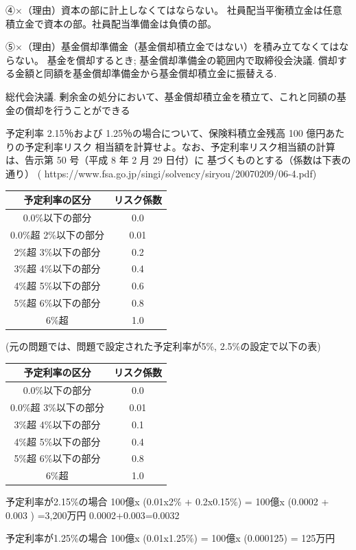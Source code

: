 \documentclass[report,gutter=10mm,fore-edge=10mm,uplatex,dvipdfmx]{jlreq}
\begin{document}
④×（理由）資本の部に計上しなくてはならない。
社員配当平衡積立金は任意積立金で資本の部。社員配当準備金は負債の部。

⑤×（理由）基金償却準備金（基金償却積立金ではない）を積み立てなくてはならない。
基金を償却するとき;   
  基金償却準備金の範囲内で取締役会決議.   
  償却する金額と同額を基金償却準備金から基金償却積立金に振替える.

  総代会決議. 剰余金の処分において、基金償却積立金を積立て、これと同額の基金の償却を行うことができる

予定利率 2.15％および 1.25％の場合について、保険料積立金残高 100 億円あたりの予定利率リスク
相当額を計算せよ。なお、予定利率リスク相当額の計算は、告示第 50 号（平成 8 年 2 月 29 日付）に
基づくものとする（係数は下表の通り）
( https://www.fsa.go.jp/singi/solvency/siryou/20070209/06-4.pdf)

\begin{tabular}{|c|c|}
\hline 予定利率の区分& リスク係数\\ \hline
 0.0\%以下の部分&0.0 \\
 0.0\%超 2\%以下の部分&0.01 \\
 2\%超 3\%以下の部分&0.2 \\
 3\%超 4\%以下の部分&0.4 \\
 4\%超 5\%以下の部分&0.6 \\
 5\%超 6\%以下の部分&0.8 \\
 6\%超 &1.0 \\
\hline
\end{tabular}

(元の問題では、問題で設定された予定利率が5\%, 2.5\%の設定で以下の表)

\begin{tabular}{|c|c|}
\hline 予定利率の区分& リスク係数\\ \hline
 0.0\%以下の部分&0.0 \\
 0.0\%超 3\%以下の部分&0.01 \\
 3\%超 4\%以下の部分&0.1 \\
 4\%超 5\%以下の部分&0.4 \\
 5\%超 6\%以下の部分&0.8 \\
 6\%超 &1.0 \\ \hline
\end{tabular}

\answer{}
予定利率が2.15\%の場合
100億x (0.01x2\% + 0.2x0.15\%) = 100億x (0.0002 + 0.003 ) =3,200万円
0.0002+0.003=0.0032

予定利率が1.25\%の場合
100億x (0.01x1.25\%) = 100億x (0.000125) = 125万円
\end{document}
